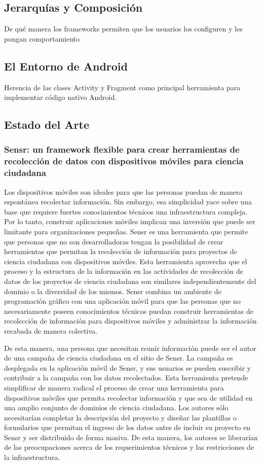  \cite{johnson1988designing}

\subsection{Jerarquías y Composición}
De qué manera los frameworks permiten que los usuarios los configuren y les pongan comportamiento

\subsection{El Entorno de Android}
Herencia de las clases Activity y Fragment como principal herramienta para implementar código nativo Android.

\subsection{Estado del Arte}
\subsubsection{Sensr: un framework flexible para crear herramientas de recolección de datos con dispositivos móviles para ciencia ciudadana}

	Los dispositivos móviles son ideales para que las personas puedan de manera espontánea recolectar información. Sin embargo, esa simplicidad yace sobre una base que requiere fuertes conocimientos técnicos una infraestructura compleja. Por lo tanto, construir aplicaciones móviles implican una inversión que puede ser limitante para organizaciones pequeñas. Sensr es una herramienta que permite que personas que no son desarrolladoras tengan la posibilidad de crear herramientas que permitan la recolección de información para proyectos de ciencia ciudadana con dispositivos móviles. Esta herramienta aprovecha que el proceso y la estructura de la información en las actividades de recolección de datos de los proyectos de ciencia ciudadana son similares independientemente del dominio o la diversidad de los mismos. Sensr combina un ambiente de programación gráfico con una aplicación móvil para que las personas que no necesariamente poseen conocimientos técnicos puedan construir herramientas de recolección de información para dispositivos móviles y administrar la información recabada de manera colectiva.
	
	De esta manera, una persona que necesitan reunir información puede ser el autor de una campaña de ciencia ciudadana en el sitio de Sensr. La campaña es desplegada en la aplicación móvil de Sensr, y sus usuarios se pueden suscribir y contribuir a la campaña con los datos recolectados. Esta herramienta pretende simplificar de manera radical el proceso de crear una herramienta para dispositivos móviles que permita recolectar información y que sea de utilidad en una amplio conjunto de dominios de ciencia ciudadana. Los autores sólo necesitarían completar la descripción del proyecto y diseñar las plantillas o formularios que permitan el ingreso de los datos antes de incluir su proyecto en Sensr y ser distribuido de forma masiva. De esta manera, los autores se liberarían de las preocupaciones acerca de los requerimientos técnicos y las restricciones de la infraestructura.
	
